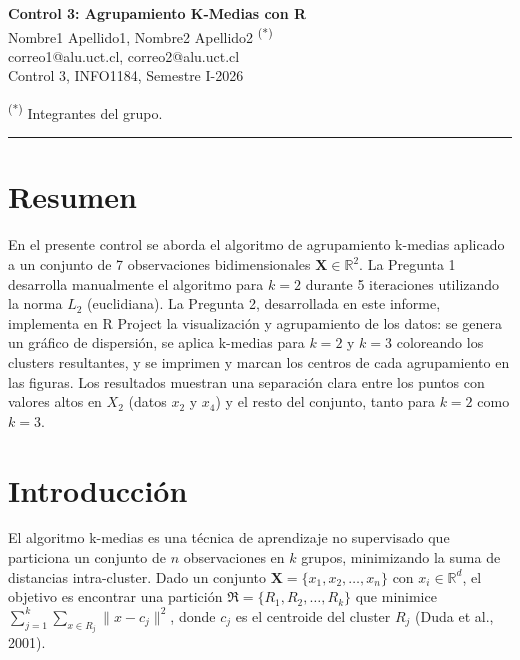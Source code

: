 \documentclass[10pt,a4paper]{article}
\begin{document}
\begin{center}
{\large \textbf{Control 3: Agrupamiento K-Medias con R}}\\[4pt]
Nombre1 Apellido1, Nombre2 Apellido2 \textsuperscript{(*)}\\[2pt]
{\small correo1@alu.uct.cl, correo2@alu.uct.cl}\\[2pt]
{\small Control 3, INFO1184, Semestre I-2026}
\end{center}
\noindent\textsuperscript{(*)} Integrantes del grupo.
\vspace{2pt}
\noindent\rule{\textwidth}{0.4pt}

\section*{Resumen}

En el presente control se aborda el algoritmo de agrupamiento k-medias aplicado a un conjunto de 7 observaciones bidimensionales $\mathbf{X} \in \mathbb{R}^2$. La Pregunta 1 desarrolla manualmente el algoritmo para $k=2$ durante 5 iteraciones utilizando la norma $L_2$ (euclidiana). La Pregunta 2, desarrollada en este informe, implementa en R Project la visualizaci\'on y agrupamiento de los datos: se genera un gr\'afico de dispersi\'on, se aplica k-medias para $k=2$ y $k=3$ coloreando los clusters resultantes, y se imprimen y marcan los centros de cada agrupamiento en las figuras. Los resultados muestran una separaci\'on clara entre los puntos con valores altos en $X_2$ (datos $x_2$ y $x_4$) y el resto del conjunto, tanto para $k=2$ como $k=3$.

\section{Introducci\'on}

El algoritmo k-medias es una t\'ecnica de aprendizaje no supervisado que particiona un conjunto de $n$ observaciones en $k$ grupos, minimizando la suma de distancias intra-cluster. Dado un conjunto $\mathbf{X} = \{x_1, x_2, \ldots, x_n\}$ con $x_i \in \mathbb{R}^d$, el objetivo es encontrar una partici\'on $\Re = \{R_1, R_2, \ldots, R_k\}$ que minimice $\sum_{j=1}^{k} \sum_{x \in R_j} \|x - c_j\|^2$, donde $c_j$ es el centroide del cluster $R_j$ (Duda et al., 2001).
\end{document}
